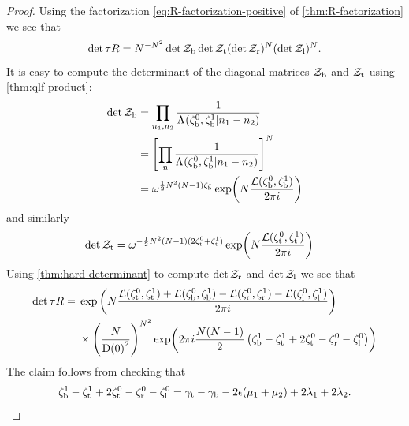 \documentclass{sl2ams}
\numberwithin{equation}{section}
\begin{document}
\begin{proof}
  Using the factorization \eqref{eq:R-factorization-positive} of \cref{thm:R-factorization} we see that
  \[
    \det \tau R =
    N^{-N^2}
    \det \mathcal{Z}_{\mathrm{b}}
    \det \mathcal{Z}_{\mathrm{t}}
    (\det \mathcal{Z}_{\mathrm{r}})^N
    (\det \mathcal{Z}_{\mathrm{l}})^N.
  \]
  It is easy to compute the determinant of the diagonal matrices \(\mathcal{Z}_{\mathrm{b}}\) and \(\mathcal{Z}_{\mathrm{t}}\) using \cref{thm:qlf-product}:
  \begin{align*}
    \det \mathcal{Z}_{\lE}
    &=
    \prod_{n_1, n_2}
    \frac{
      1
    }{
      \qlf{\zeta^0_{\lE} , \zeta^1_{\lE}}{n_1 - n_2}
    }
    \\
    &=
    \left[
      \prod_{n}
      \frac{
        1
      }{
        \qlf{\zeta^0_{\lE} , \zeta^1_{\lE}}{n_1 - n_2}
      }
    \right]^{\nr}
    \\
    &=
    \omega^{\frac{1}{2} \nr^2(\nr-1) \zeta_{\lE}^1}
    \exp
    \leftfun(
      \nr
      \frac{\dilr(\zeta^0_{\lE}, \zeta_{\lE}^1)}{2\pi i}
    \rightfun)
  \end{align*}
  and similarly
  \begin{align*}
    \det \mathcal{Z}_{\mathrm{t}}
    &=
    \omega^{-\frac{1}{2}N^2(N-1) (2 \zeta_{\mathrm{t}}^0 + \zeta_{\mathrm{t}}^1)}
    \exp
    \mathopen{}\left(
      N
      \frac{\mathcal{L}(\zeta^0_{\mathrm{t}}, \zeta_{\mathrm{t}}^1)}{2\pi i}
    \right)
  \end{align*}
  Using \cref{thm:hard-determinant} to compute \(\det \mathcal{Z}_{\mathrm{r}}\) and \(\det \mathcal{Z}_{\mathrm{l}}\) we see that
  \begin{align*}
    \det \tau R
    =
    {}
    &
      \exp \left(
        \nr
        \frac{
          \dilr(\zeta^0_{\lW}, \zeta^1_{\lW})
          +
          \dilr(\zeta^0_{\lE}, \zeta^1_{\lE})
          -
          \dilr(\zeta^0_{\lN}, \zeta^1_{\lN})
          -
          \dilr(\zeta^0_{\lS}, \zeta^1_{\lS})
        }{
          2\pi i
        }
      \right)
    \\
    &\times
    \left(
      \frac{N}{\df{0}^2}
    \right)^{\nr^2}
    \exp
    \leftfun(
    2 \pi i
    \frac{\nr (\nr -1)}{2}
    \left(
      \zeta_{\lE}^1 - \zeta_{\lW}^1
      + 2 \zeta_{\lW}^0
      - \zeta_{\lN}^0 - \zeta_{\lS}^0
    \right)
    \rightfun)
  \end{align*}
  The claim follows from checking that
  \begin{equation*}
    \zeta_{\mathrm{b}}^1 - \zeta_{\mathrm{t}}^1
    + 2 \zeta_{\mathrm{t}}^0
    - \zeta_{\mathrm{r}}^0 - \zeta_{\mathrm{l}}^0
    =
    \gamma_{\mathrm{t}} - \gamma_{\mathrm{b}} - 2 \epsilon(\mu_{1} + \mu_{2}) + 2 \lambda_{1} + 2 \lambda_{2}.
    \qedhere
  \end{equation*}
\end{proof}
\end{document}
